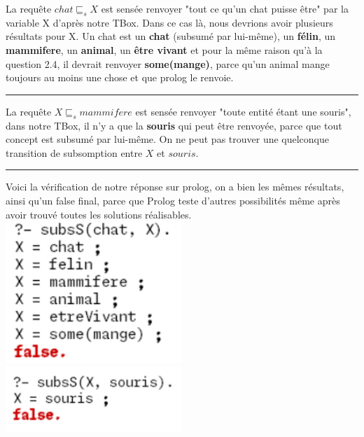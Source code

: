 \documentclass[a4paper,12pt]{report}
\begin{document}
\begin{tcolorbox}[colback=gray!10, colframe=blue!30, coltitle=black, title=Réponse à la question 2.5 - 1/1]

    La requête \(chat \sqsubseteq_s X\) est sensée renvoyer "tout ce qu'un chat puisse être" par la variable X d'après notre TBox. Dans ce cas là, nous devrions avoir plusieurs
        résultats pour X. Un chat est un \textbf{chat} (subsumé par lui-même), un \textbf{félin}, un \textbf{mammifere}, un \textbf{animal}, un \textbf{être vivant} et
        pour la même raison qu'à la question 2.4, il devrait renvoyer \textbf{some(mange)}, parce qu'un animal mange toujours au moins une chose et que prolog le renvoie.\\

    \vspace{0.5cm}
    \hrule
    \vspace{0.5cm}
          
    La requête \(X \sqsubseteq_s mammifere\) est sensée renvoyer "toute entité étant une souris", dans notre TBox, il n'y a que la \textbf{souris} qui peut être renvoyée,
        parce que tout concept est subsumé par lui-même. On ne peut pas trouver une quelconque transition de subsomption entre \(X\) et \(souris\). 

    \vspace{0.5cm}
    \hrule
    \vspace{0.5cm}

    Voici la vérification de notre réponse sur prolog, on a bien les mêmes résultats, ainsi qu'un false final, parce que Prolog teste d'autres possibilités même après avoir trouvé
        toutes les solutions réalisables.\\[0.5cm]
    \includegraphics[width=0.5\textwidth]{./images/chat_X.png}
    \includegraphics[width=0.5\textwidth]{./images/X_souris.png}

\end{tcolorbox}
\end{document}
